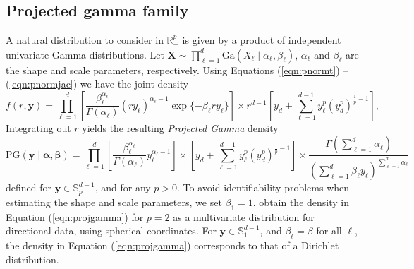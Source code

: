 \subsection{Projected gamma family\label{subsec:projgamma}}
  A natural  distribution to consider in ${\mathbb R}^p_+$ is given by a product of independent
  univariate Gamma distributions. Let
    $\bm{ X} \sim \prod_{\ell = 1}^d\text{Ga}\left(X_{\ell}\mid\alpha_{\ell},\beta_{\ell}\right)$, 
    $\alpha_\ell$ and $\beta_\ell$ are the shape and scale parameters, respectively. Using Equations (\ref{eqn:pnormt}) -- (\ref{eqn:pnormjac}) we have the joint density
  \begin{equation*}
    f(r,\bm{ y}) = \prod_{\ell = 1}^{d}
      \left[\frac{\beta_{\ell}^{\alpha_{\ell}}}{\Gamma(\alpha_{\ell})}(ry_{\ell})^{\alpha_{\ell} - 1}
          \exp\lbrace-\beta_{\ell}ry_{\ell}\rbrace\right]
      \times r^{d-1}\left[y_d +
            {\textstyle \sum}_{\ell = 1}^{d-1}y_{\ell}^p\left(y_d^p\right)^{\frac{1}{p} - 1}\right],
  \end{equation*}
  Integrating out $r$ yields the resulting \emph{Projected Gamma} density
  \begin{equation}
    \label{eqn:projgamma}
    \text{PG}(\bm{ y}\mid\bm{ \alpha},\bm{ \beta}) =
          \prod_{\ell = 1}^d\left[\frac{\beta_{\ell}^{\alpha_{\ell}}}{\Gamma(\alpha_{\ell})}
                y_{\ell}^{\alpha_{\ell} - 1}\right]
      \times \left[y_d +
          {\textstyle \sum}_{\ell = 1}^{d-1}y_{\ell}^p\left(y_d^p\right)^{\frac{1}{p} - 1}\right]
      \times \frac{\Gamma({\textstyle\sum}_{\ell = 1}^d\alpha_{\ell})}{\left({\textstyle\sum}_{\ell = 1}^d
                    \beta_{\ell}y_{\ell}\right)^{{\scriptstyle\sum_{\ell = 1}^d \alpha_{\ell}}}}
  \end{equation}
  defined for $\bm{y}\in {\mathbb S}_p^{d-1}$, and for any $p>0$. To avoid identifiability problems when estimating the shape and scale parameters, we set $\beta_1 = 1$.
  \cite{nunez2019} obtain the density in Equation (\ref{eqn:projgamma})
  for $p=2$ as a multivariate distribution for directional data, using spherical coordinates.
  For $\bm{ y}\in {\mathbb S}_1^{d-1}$, and $\beta_{\ell} = \beta$ for all $\ell$, the density in Equation (\ref{eqn:projgamma}) corresponds to that of a Dirichlet distribution.
  
